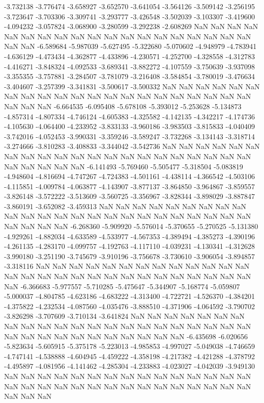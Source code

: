 -3.732138
-3.776474
-3.658927
-3.652570
-3.641054
-3.564126
-3.509142
-3.256195
-3.723647
-3.703306
-3.309741
-3.293777
-3.426548
-3.502039
-3.103307
-3.419600
-4.094232
-3.057824
-3.068900
-3.280599
-3.292238
-2.608269
NaN
NaN
NaN
NaN
NaN
NaN
NaN
NaN
NaN
NaN
NaN
NaN
NaN
NaN
NaN
NaN
NaN
NaN
NaN
NaN
NaN
-6.589684
-5.987039
-5.627495
-5.322680
-5.070602
-4.948979
-4.783941
-4.636129
-4.473434
-4.362877
-4.433896
-4.230571
-4.252700
-4.328558
-4.312783
-4.416271
-3.848324
-4.092533
-3.689341
-3.882272
-4.107559
-3.750639
-3.937098
-3.355355
-3.757881
-3.284507
-3.781079
-3.216408
-3.584854
-3.780019
-3.476634
-3.404607
-3.257399
-3.341831
-3.500617
-3.500332
NaN
NaN
NaN
NaN
NaN
NaN
NaN
NaN
NaN
NaN
NaN
NaN
NaN
NaN
NaN
NaN
NaN
NaN
NaN
NaN
NaN
NaN
NaN
NaN
-6.664535
-6.095408
-5.678108
-5.393012
-5.253628
-5.134873
-4.857314
-4.807334
-4.746124
-4.605383
-4.325582
-4.142135
-4.342217
-4.174736
-4.105630
-4.064400
-4.233952
-3.833133
-3.960186
-3.983503
-3.815833
-4.040409
-3.742016
-4.052453
-3.990331
-3.359246
-3.589247
-3.732268
-3.134143
-3.318714
-3.274666
-3.810283
-3.408833
-3.344042
-3.542736
NaN
NaN
NaN
NaN
NaN
NaN
NaN
NaN
NaN
NaN
NaN
NaN
NaN
NaN
NaN
NaN
NaN
NaN
NaN
NaN
NaN
NaN
NaN
NaN
NaN
NaN
-6.141493
-5.769460
-5.505477
-5.318504
-5.083819
-4.948604
-4.816694
-4.747267
-4.724383
-4.501161
-4.438114
-4.366542
-4.503106
-4.115851
-4.009784
-4.063877
-4.143907
-3.877137
-3.864850
-3.964867
-3.859557
-3.826148
-3.572222
-3.513609
-3.560725
-3.356967
-3.828344
-3.898029
-3.887847
-3.860191
-3.652082
-3.459313
NaN
NaN
NaN
NaN
NaN
NaN
NaN
NaN
NaN
NaN
NaN
NaN
NaN
NaN
NaN
NaN
NaN
NaN
NaN
NaN
NaN
NaN
NaN
NaN
NaN
NaN
NaN
NaN
-6.268360
-5.909920
-5.576014
-5.370655
-5.270525
-5.131380
-4.929261
-4.882034
-4.633589
-4.533977
-4.567353
-4.389494
-4.385273
-4.390196
-4.261135
-4.283170
-4.099757
-4.192763
-4.117110
-4.039231
-4.130341
-4.312628
-3.990180
-3.251190
-3.745679
-3.910196
-3.756678
-3.730610
-3.906054
-3.894857
-3.318116
NaN
NaN
NaN
NaN
NaN
NaN
NaN
NaN
NaN
NaN
NaN
NaN
NaN
NaN
NaN
NaN
NaN
NaN
NaN
NaN
NaN
NaN
NaN
NaN
NaN
NaN
NaN
NaN
NaN
-6.366683
-5.977557
-5.710285
-5.475647
-5.344907
-5.168774
-5.059807
-5.000037
-4.804785
-4.623186
-4.683222
-4.313400
-4.722721
-4.526370
-4.384201
-4.375822
-4.232534
-4.087560
-4.035476
-3.888510
-4.371906
-4.064592
-3.790702
-3.826298
-3.707609
-3.710134
-3.641824
NaN
NaN
NaN
NaN
NaN
NaN
NaN
NaN
NaN
NaN
NaN
NaN
NaN
NaN
NaN
NaN
NaN
NaN
NaN
NaN
NaN
NaN
NaN
NaN
NaN
NaN
NaN
NaN
NaN
NaN
NaN
NaN
NaN
-6.435698
-6.020656
-5.823634
-5.605915
-5.375178
-5.223013
-4.985853
-4.997027
-5.049038
-4.746659
-4.747141
-4.538888
-4.604945
-4.459222
-4.358198
-4.217382
-4.421288
-4.378792
-4.495897
-4.081956
-4.141462
-4.285304
-4.233883
-4.023027
-4.042039
-3.949130
NaN
NaN
NaN
NaN
NaN
NaN
NaN
NaN
NaN
NaN
NaN
NaN
NaN
NaN
NaN
NaN
NaN
NaN
NaN
NaN
NaN
NaN
NaN
NaN
NaN
NaN
NaN
NaN
NaN
NaN
NaN
NaN
NaN
